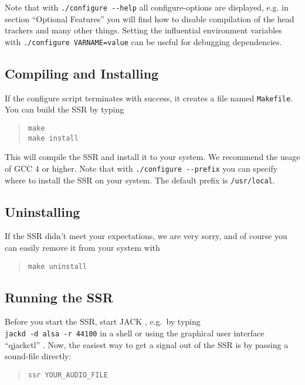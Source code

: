 Note that with \verb+./configure --help+ all configure-options are displayed,
e.g. in section ``Optional Features'' you will find how to
disable compilation of the head trackers
and many other things.
Setting the influential environment variables with
\verb+./configure VARNAME=value+ can be useful for debugging dependencies.

\subsection{Compiling and Installing}
\label{sec:comp_inst}

If the configure script terminates with success, it creates a file named 
\texttt{Makefile}. You can build the SSR by typing

\begin{quote}
\texttt{make}\\
\texttt{make install}
\end{quote}
%
This will compile the SSR and install it to your system. We recommend the usage of GCC 4 or higher. Note that with \verb+./configure --prefix+ you can specify
where to install the SSR on your system. The default prefix is
\texttt{/usr/local}.

\subsection{Uninstalling}

If the SSR didn't meet your expectations, we are very sorry, and of course you
can easily remove it from your system with
\begin{quote}
\texttt{make uninstall}
\end{quote}

\subsection{Running the SSR}
\label{sec:running_ssr}

Before you start the SSR, start JACK \cite{jack}, e.g.~by typing\\
\verb+jackd -d alsa -r 44100+ in a shell or using the graphical user
interface ``qjackctl'' \cite{qjackctl}.
Now, the easiest way to get a signal out of the SSR is
by passing a sound-file directly:

\begin{quote}
\begin{verbatim}
ssr YOUR_AUDIO_FILE
\end{verbatim}
\end{quote}

